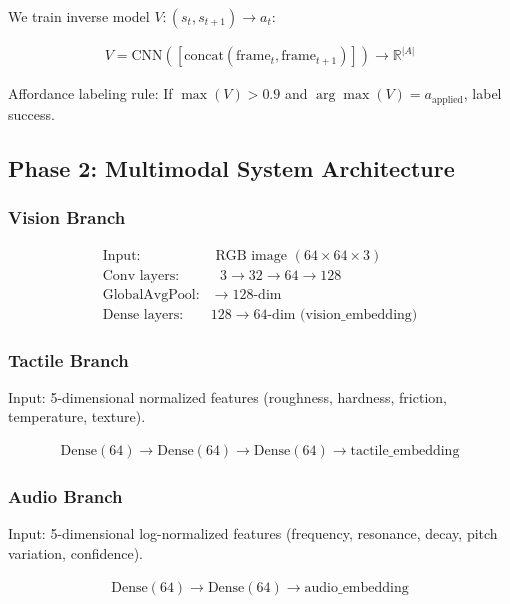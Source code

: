 \documentclass[11pt]{article}
\begin{document}
We train inverse model $V: (s_t, s_{t+1}) \to a_t$:

\begin{align}
V = \text{CNN}([\text{concat}(\text{frame}_t, \text{frame}_{t+1})]) \to \mathbb{R}^{|A|}
\end{align}

Affordance labeling rule: If $\max(V) > 0.9$ and $\arg\max(V) = a_{\text{applied}}$, label success.

\subsection{Phase 2: Multimodal System Architecture}

\subsubsection{Vision Branch}

\begin{align}
\text{Input}: & \text{ RGB image } (64 \times 64 \times 3) \\
\text{Conv layers}: & \text{ } 3 \to 32 \to 64 \to 128 \\
\text{GlobalAvgPool}: & \to 128\text{-dim} \\
\text{Dense layers}: & 128 \to 64\text{-dim (vision\_embedding)}
\end{align}

\subsubsection{Tactile Branch}

Input: 5-dimensional normalized features (roughness, hardness, friction, temperature, texture).

\begin{align}
\text{Dense}(64) \to \text{Dense}(64) \to \text{Dense}(64) \to \text{tactile\_embedding}
\end{align}

\subsubsection{Audio Branch}

Input: 5-dimensional log-normalized features (frequency, resonance, decay, pitch variation, confidence).

\begin{align}
\text{Dense}(64) \to \text{Dense}(64) \to \text{audio\_embedding}
\end{align}
\end{document}
